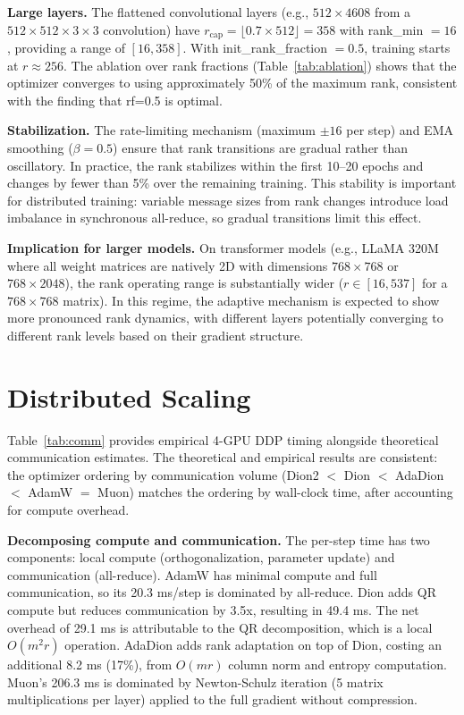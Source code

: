 \documentclass[10pt,twocolumn]{article}
\begin{document}
\textbf{Large layers.} The flattened convolutional layers (e.g., $512 \times 4608$ from a $512 \times 512 \times 3 \times 3$ convolution) have $r_\text{cap} = \lfloor 0.7 \times 512 \rfloor = 358$ with rank\_min $= 16$, providing a range of $[16, 358]$. With init\_rank\_fraction $= 0.5$, training starts at $r \approx 256$. The ablation over rank fractions (Table~\ref{tab:ablation}) shows that the optimizer converges to using approximately 50\% of the maximum rank, consistent with the finding that rf=0.5 is optimal.

\textbf{Stabilization.} The rate-limiting mechanism (maximum $\pm 16$ per step) and EMA smoothing ($\beta = 0.5$) ensure that rank transitions are gradual rather than oscillatory. In practice, the rank stabilizes within the first 10--20 epochs and changes by fewer than 5\% over the remaining training. This stability is important for distributed training: variable message sizes from rank changes introduce load imbalance in synchronous all-reduce, so gradual transitions limit this effect.

\textbf{Implication for larger models.} On transformer models (e.g., LLaMA 320M where all weight matrices are natively 2D with dimensions $768 \times 768$ or $768 \times 2048$), the rank operating range is substantially wider ($r \in [16, 537]$ for a $768 \times 768$ matrix). In this regime, the adaptive mechanism is expected to show more pronounced rank dynamics, with different layers potentially converging to different rank levels based on their gradient structure.

\section{Distributed Scaling}

Table~\ref{tab:comm} provides empirical 4-GPU DDP timing alongside theoretical communication estimates. The theoretical and empirical results are consistent: the optimizer ordering by communication volume (Dion2 $<$ Dion $<$ AdaDion $<$ AdamW $=$ Muon) matches the ordering by wall-clock time, after accounting for compute overhead.

\textbf{Decomposing compute and communication.} The per-step time has two components: local compute (orthogonalization, parameter update) and communication (all-reduce). AdamW has minimal compute and full communication, so its 20.3 ms/step is dominated by all-reduce. Dion adds QR compute but reduces communication by 3.5x, resulting in 49.4 ms. The net overhead of 29.1 ms is attributable to the QR decomposition, which is a local $O(m^2r)$ operation. AdaDion adds rank adaptation on top of Dion, costing an additional 8.2 ms (17\%), from $O(mr)$ column norm and entropy computation. Muon's 206.3 ms is dominated by Newton-Schulz iteration (5 matrix multiplications per layer) applied to the full gradient without compression.
\end{document}
